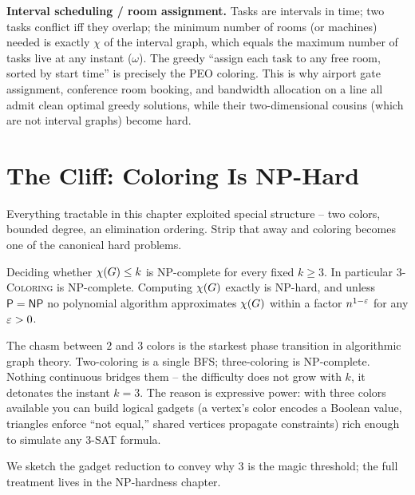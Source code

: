 \begin{applicationbox}
\textbf{Interval scheduling / room assignment.} Tasks are intervals in time; two
tasks conflict iff they overlap; the minimum number of rooms (or machines) needed
is exactly $\chi$ of the interval graph, which equals the maximum number of tasks
live at any instant ($\omega$). The greedy ``assign each task to any free room,
sorted by start time'' is precisely the PEO coloring. This is why airport gate
assignment, conference room booking, and bandwidth allocation on a line all admit
clean optimal greedy solutions, while their two-dimensional cousins (which are not
interval graphs) become hard.
\end{applicationbox}

\section{The Cliff: Coloring Is NP-Hard}
\label{ch28:nphard}

Everything tractable in this chapter exploited special structure -- two colors,
bounded degree, an elimination ordering. Strip that away and coloring becomes one
of the canonical hard problems.

\begin{theorem}
\label{ch28:thm-nphard}
Deciding whether $\chi(G)\le k$ is NP-complete for every fixed $k\ge 3$. In
particular \textsc{3-Coloring} is NP-complete. Computing $\chi(G)$ exactly is
NP-hard, and unless $\mathsf{P}=\mathsf{NP}$ no polynomial algorithm approximates
$\chi(G)$ within a factor $n^{1-\varepsilon}$ for any $\varepsilon>0$.
\end{theorem}

\begin{intuitionbox}
The chasm between $2$ and $3$ colors is the starkest phase transition in
algorithmic graph theory. Two-coloring is a single BFS; three-coloring is
NP-complete. Nothing continuous bridges them -- the difficulty does not grow with
$k$, it detonates the instant $k=3$. The reason is expressive power: with three
colors available you can build logical gadgets (a vertex's color encodes a Boolean
value, triangles enforce ``not equal,'' shared vertices propagate constraints) rich
enough to simulate any \textsc{3-SAT} formula.
\end{intuitionbox}

We sketch the gadget reduction to convey why $3$ is the magic threshold; the full
treatment lives in the NP-hardness chapter.

